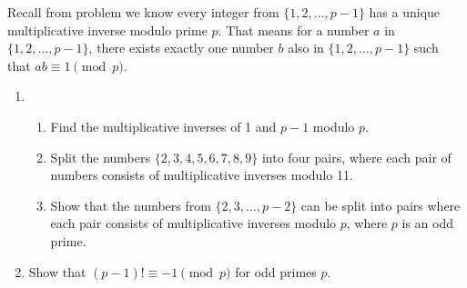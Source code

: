 \documentclass[11pt]{article}
\theoremstyle{definition}
\begin{document}
Recall from problem  we know every integer from $\{1, 2, \ldots, p - 1\}$ has a unique multiplicative inverse modulo prime $p$. That means for a number $a$ in $\{1, 2, \ldots, p - 1\}$, there exists exactly one number $b$ also in $\{1, 2, \ldots, p - 1\}$ such that $ab \equiv 1 \pmod{p}$.

\begin{enumerate} \addtocounter{enumi}{\value{problem_count}}

\item \addtocounter{problem_count}{1}
\begin{enumerate}
\item Find the multiplicative inverses of 1 and $p - 1$ modulo $p$.

\item Split the numbers $\{ 2, 3, 4, 5, 6, 7, 8, 9\}$ into four pairs, where each pair of numbers consists of multiplicative inverses modulo 11.

\item Show that the numbers from $\{ 2, 3, \ldots, p - 2\}$ can be split into pairs where each pair consists of multiplicative inverses modulo $p$, where $p$ is an odd prime.

\end{enumerate}

\item \addtocounter{problem_count}{1}
Show that $(p - 1)! \equiv -1 \pmod{p}$ for odd primes $p$.

\end{enumerate}
\end{document}
